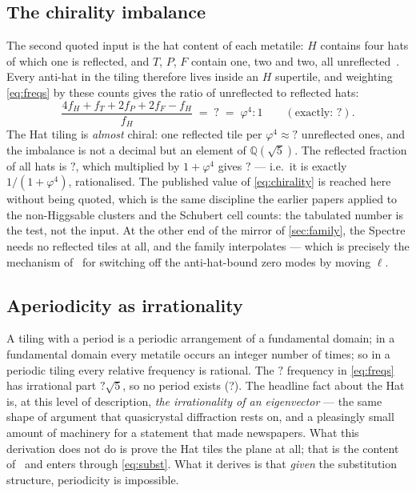 \documentclass[11pt,a4paper]{article}
\newcommand{\MTPhiFourFloat}{?}\newcommand{\MTPhiFourIsRoot}{?}
\newcommand{\MTChiralRatio}{?}\newcommand{\MTChiralIsPhiFour}{?}
\newcommand{\MTReflectedFraction}{?}\newcommand{\MTReflectedTimesOnePlus}{?}
\newcommand{\MTAperiodic}{?}\newcommand{\MTWitness}{?}
\newcommand{\MTWitnessIrr}{?}\newcommand{\MTSitesGeneric}{?}
\newcommand{\QQ}{\mathbb{Q}}
\theoremstyle{definition}
\begin{document}
\subsection{The chirality imbalance}

The second quoted input is the hat content of each metatile: $H$ contains
four hats of which one is reflected, and $T$, $P$, $F$ contain one, two and
two, all unreflected~\cite{Smith2023a}. Every anti-hat in the tiling
therefore lives inside an $H$ supertile, and weighting \cref{eq:freqs} by
these counts gives the ratio of unreflected to reflected hats:
%
\begin{equation}
\frac{4f_H + f_T + 2f_P + 2f_F - f_H}{f_H}
\;=\; \MTChiralRatio \;=\; \varphi^4 : 1
\qquad (\text{exactly: } \MTChiralIsPhiFour).
\label{eq:chirality}
\end{equation}
%
The Hat tiling is \emph{almost} chiral: one reflected tile per
$\varphi^4 \approx \MTPhiFourFloat$ unreflected ones, and the imbalance is
not a decimal but an element of $\QQ(\sqrt5)$. The reflected fraction of all
hats is $\MTReflectedFraction$, which multiplied by $1 + \varphi^4$ gives
$\MTReflectedTimesOnePlus$ --- i.e.\ it is exactly $1/(1+\varphi^4)$,
rationalised. The published value of \cref{eq:chirality} is reached here
without being quoted, which is the same discipline the earlier papers
applied to the non-Higgsable clusters and the Schubert cell counts: the
tabulated number is the test, not the input. At the other end of the mirror
of \cref{sec:family}, the Spectre needs no reflected tiles at all, and the
family interpolates --- which is precisely the mechanism
of~\cite{RocheCarrasco2025} for switching off the anti-hat-bound zero modes
by moving $\ell$.

\subsection{Aperiodicity as irrationality}

A tiling with a period is a periodic arrangement of a fundamental domain; in
a fundamental domain every metatile occurs an integer number of times; so in
a periodic tiling every relative frequency is rational. The $\MTWitness$
frequency in \cref{eq:freqs} has irrational part $\MTWitnessIrr \sqrt5$, so
no period exists (\MTAperiodic). The headline fact about the Hat is, at this
level of description, \emph{the irrationality of an eigenvector} --- the
same shape of argument that quasicrystal diffraction rests on, and a
pleasingly small amount of machinery for a statement that made newspapers.
What this derivation does not do is prove the Hat tiles the plane at all;
that is the content of~\cite{Smith2023a} and enters through
\cref{eq:subst}. What it derives is that \emph{given} the substitution
structure, periodicity is impossible.
\end{document}
